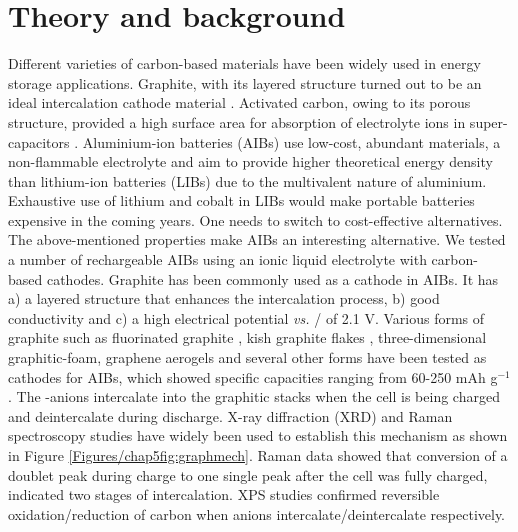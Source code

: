 \section{Theory and background}
Different varieties of carbon-based materials have been widely used in energy storage applications. Graphite, with its layered structure turned out to be an ideal intercalation cathode material \cite{ji_recent_2011, yoo_large_2008, lian_large_2010}. Activated carbon, owing to its porous structure, provided a high surface area for absorption of electrolyte ions in super-capacitors \cite{eliad_ion_2001, zhu_carbon-based_2011-2}. Aluminium-ion batteries (AIBs) use low-cost, abundant materials, a non-flammable electrolyte and aim to provide higher theoretical energy density than lithium-ion batteries (LIBs) due to the multivalent nature of aluminium. Exhaustive use of lithium and cobalt in LIBs would make portable batteries expensive in the coming years. One needs to switch to cost-effective alternatives. The above-mentioned properties make AIBs an interesting alternative\cite{ambroz_trends_2017-1}. We tested a number of rechargeable AIBs using an ionic liquid electrolyte with carbon-based cathodes.
Graphite has been commonly used as a cathode in AIBs. It has a) a layered structure that enhances the intercalation process, b) good conductivity and c) a high electrical potential {\it vs.} / of 2.1 V. Various forms of graphite such as fluorinated graphite \cite{rani_fluorinated_2013}, kish graphite flakes \cite{wang_kish_2017-1}, three-dimensional graphitic-foam\cite{wu_3d_2016}, graphene aerogels\cite{huang_graphene_2019} and several other forms have been tested as cathodes for AIBs, which showed specific capacities ranging from 60-250 mAh g$^{-1}$. The -anions intercalate into the graphitic stacks when the cell is being charged and deintercalate during discharge. X-ray diffraction (XRD) and Raman spectroscopy studies have widely been used to establish this mechanism\cite{rani_fluorinated_2013, wang_advanced_2017, lin_ultrafast_2015-3} as shown in Figure \ref{Figures/chap5fig:graphmech}. Raman data showed that conversion of a doublet peak during charge to one single peak after the cell was fully charged, indicated two stages of intercalation. XPS studies confirmed reversible oxidation/reduction of carbon when  anions intercalate/deintercalate respectively\cite{stadie_zeolite-templated_2017, liu_binder-free_2019}.

